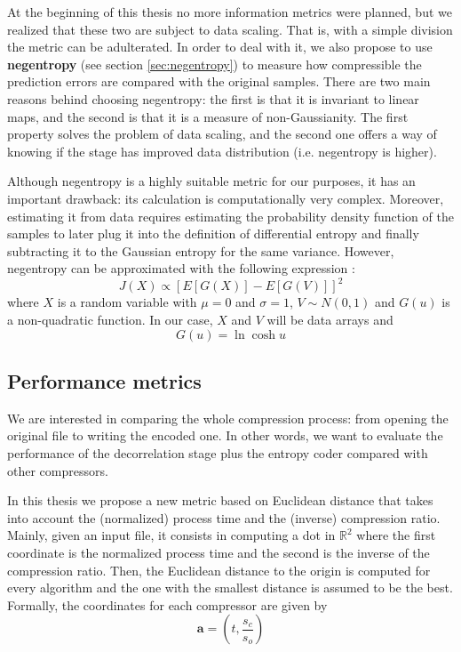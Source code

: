 At the beginning of this thesis no more information metrics were planned, but we realized that these two are subject to data scaling. That is, with a simple division the metric can be adulterated. In order to deal with it, we also propose to use \textbf{negentropy} (see section \ref{sec:negentropy}) to measure how compressible the prediction errors are compared with the original samples. There are two main reasons behind choosing negentropy: the first is that it is invariant to linear maps, and the second is that it is a measure of non-Gaussianity. The first property solves the problem of data scaling, and the second one offers a way of knowing if the stage has improved data distribution (i.e. negentropy is higher).

Although negentropy is a highly suitable metric for our purposes, it has an important drawback: its calculation is computationally very complex. Moreover, estimating it from data requires estimating the probability density function of the samples to later plug it into the definition of differential entropy and finally subtracting it to the Gaussian entropy for the same variance. However, negentropy can be approximated with the following expression \parencite{HYVARINEN2000411}:
\begin{equation}
J(X) \propto \left[E[G(X)] - E[G(V)]\right]^2
\end{equation}
where $X$ is a random variable with $\mu = 0$ and $\sigma = 1$, $V \sim N(0,1)$ and $G(u)$ is a non-quadratic function. In our case, $X$ and $V$ will be data arrays and
\begin{equation}
G(u) = \ln \cosh u
\end{equation}

\subsection{Performance metrics}
We are interested in comparing the whole compression process: from opening the original file to writing the encoded one. In other words, we want to evaluate the performance of the decorrelation stage plus the entropy coder compared with other compressors.

In this thesis we propose a new metric based on Euclidean distance that takes into account the (normalized) process time and the (inverse) compression ratio. Mainly, given an input file, it consists in computing a dot in $\mathbb{R}^2$ where the first coordinate is the normalized process time and the second is the inverse of the compression ratio. Then, the Euclidean distance to the origin is computed for every algorithm and the one with the smallest distance is assumed to be the best. Formally, the coordinates for each compressor are given by
\begin{equation} \label{eq:dot_comp}
\mathbf{a} = \left(t, \frac{s_c}{s_o}\right)
\end{equation}

